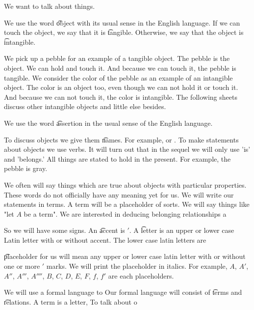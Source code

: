 

We want to talk about things.


We use the word \t{object} with its usual sense in the English language.
If we can touch the object, we say that it is \t{tangible}.
Otherwise, we say that the object is \t{intangible}.


We pick up a pebble for an example of a tangible object.
The pebble is the object.
We can hold and touch it.
And because we can touch it, the pebble is tangible.
We consider the color of the pebble as an example of an intangible object.
The color is an object too, even though we can not hold it or touch it.
And because we can not touch it, the color is intangible.
The following sheets discuss other intangible objects and little else besides.


We use the word \t{assertion} in the usual sense of the English language.


To discuss objects we give them \t{names}.
For example,  or .
To make statements about objects we use verbs.
It will turn out that in the sequel we will only use 'is' and 'belongs.'
All things are stated to hold in the present.
For example, the pebble is gray.


We often will say things which are true about objects with particular properties.
These words do not officially have any meaning yet for us.
We will write our statements in terms.
A term will be a placeholder of sorts.
We will say things like "let $A$ be a term".
We are interested in deducing belonging relationships a

So we will have some signs.
An \t{accent} is $'$.
A \t{letter} is an upper or lower case Latin letter with or without accent.
The lower case latin letters are

 \t{placeholder} for us will mean any upper or lower case latin letter with or without one or more $'$ marks.
We will print the placeholder in italics.
For example, $A$, $A'$, $A''$, $A'''$, $A''''$, $B$, $C$, $D$, $E$, $F$, $f$, $f'$ are each placeholders.

We will use a formal language to
Our formal language will consist of \t{terms} and \t{relations}.
A term is a letter,
To talk about o

